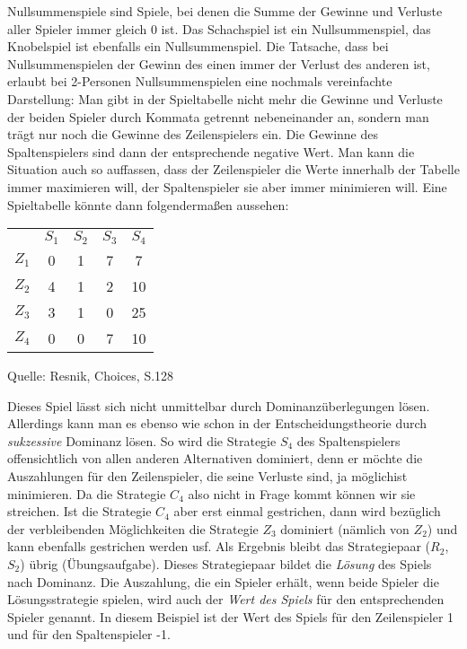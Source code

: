 Nullsummenspiele sind Spiele, bei denen die Summe der Gewinne und Verluste aller
Spieler immer gleich 0 ist. Das Schachspiel ist ein Nullsummenspiel, das
Knobelspiel ist ebenfalls ein Nullsummenspiel. Die Tatsache, dass bei
Nullsummenspielen der Gewinn des einen immer der Verlust des anderen ist,
erlaubt bei 2-Personen Nullsummenspielen eine nochmals vereinfachte
Darstellung: Man gibt in der Spieltabelle nicht mehr die Gewinne und Verluste
der beiden Spieler durch Kommata getrennt nebeneinander an, sondern man trägt
nur noch die Gewinne des Zeilenspielers ein. Die Gewinne des Spaltenspielers
sind dann der entsprechende negative Wert. Man kann die Situation auch so
auffassen, dass der Zeilenspieler die Werte innerhalb der Tabelle immer
maximieren will, der Spaltenspieler sie aber immer minimieren will.
Eine Spieltabelle könnte dann folgendermaßen aussehen:

\begin{center}
\setlength{\parskip}{0.5cm}
\begin{tabular}{c|c|c|c|c|}
\multicolumn{1}{c}{} & 
\multicolumn{1}{c}{$S_1$} &
\multicolumn{1}{c}{$S_2$} &
\multicolumn{1}{c}{$S_3$} &
\multicolumn{1}{c}{$S_4$} \\ \cline{2-5}

$Z_1$ & 0 & 1 & 7 & 7  \\ \cline{2-5}
$Z_2$ & 4 & 1 & 2 & 10 \\ \cline{2-5}
$Z_3$ & 3 & 1 & 0 & 25 \\ \cline{2-5}
$Z_4$ & 0 & 0 & 7 & 10 \\ \cline{2-5}

\end{tabular}

{\footnotesize Quelle: Resnik, Choices, S.128 \cite[]{resnik:1987}}
\end{center}

Dieses Spiel lässt sich nicht unmittelbar durch Dominanzüberlegungen lösen.
Allerdings kann man es ebenso wie schon in der Entscheidungstheorie durch
{\em sukzessive} Dominanz lösen. So wird die Strategie $S_4$ des Spaltenspielers
offensichtlich von allen anderen Alternativen dominiert, denn er möchte die
Auszahlungen für den Zeilenspieler, die seine Verluste sind, ja möglichist
minimieren. Da die Strategie $C_4$ also nicht in Frage kommt können wir sie
streichen. Ist die Strategie $C_4$ aber erst einmal gestrichen, dann wird
bezüglich der verbleibenden Möglichkeiten die Strategie $Z_3$ dominiert
(nämlich von $Z_2$) und kann ebenfalls gestrichen werden usf. Als Ergebnis
bleibt das Strategiepaar ($R_2$, $S_2$) übrig (Übungsaufgabe). 
Dieses Strategiepaar bildet die {\em Lösung}
des Spiels nach Dominanz. Die Auszahlung, die ein Spieler erhält, wenn beide
Spieler die Lösungsstrategie spielen, wird auch der {\em Wert des Spiels} für den
entsprechenden Spieler genannt. In diesem Beispiel ist der Wert des Spiels für
den Zeilenspieler 1 und für den Spaltenspieler -1.

